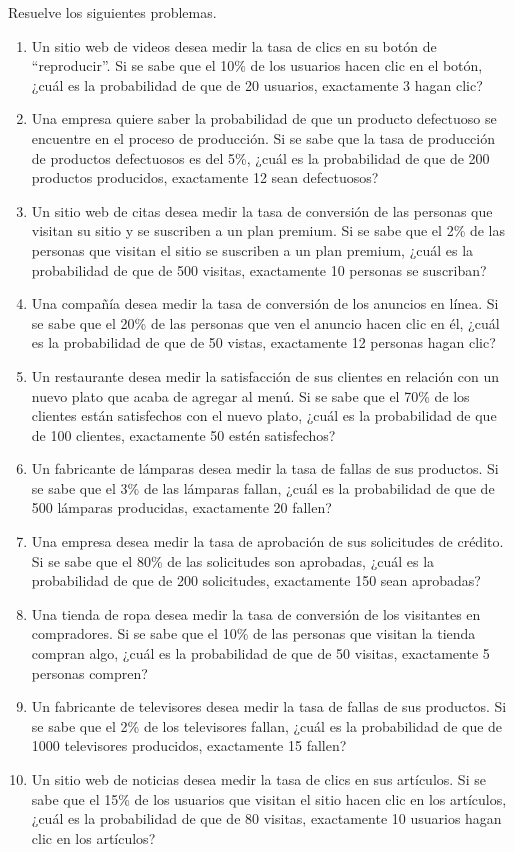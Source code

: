 \begin{Ejer} 
Resuelve los siguientes problemas.

\begin{enumerate}
    \item Un sitio web de videos desea medir la tasa de clics en su botón de ``reproducir''. Si se sabe que el 10\% de los usuarios hacen clic en el botón, ¿cuál es la probabilidad de que de 20 usuarios, exactamente 3 hagan clic?
    \item Una empresa quiere saber la probabilidad de que un producto defectuoso se encuentre en el proceso de producción. Si se sabe que la tasa de producción de productos defectuosos es del 5\%, ¿cuál es la probabilidad de que de 200 productos producidos, exactamente 12 sean defectuosos?
    \item Un sitio web de citas desea medir la tasa de conversión de las personas que visitan su sitio y se suscriben a un plan premium. Si se sabe que el 2\% de las personas que visitan el sitio se suscriben a un plan premium, ¿cuál es la probabilidad de que de 500 visitas, exactamente 10 personas se suscriban?
    \item Una compañía desea medir la tasa de conversión de los anuncios en línea. Si se sabe que el 20\% de las personas que ven el anuncio hacen clic en él, ¿cuál es la probabilidad de que de 50 vistas, exactamente 12 personas hagan clic?
    \item Un restaurante desea medir la satisfacción de sus clientes en relación con un nuevo plato que acaba de agregar al menú. Si se sabe que el 70\% de los clientes están satisfechos con el nuevo plato, ¿cuál es la probabilidad de que de 100 clientes, exactamente 50 estén satisfechos?
    \item Un fabricante de lámparas desea medir la tasa de fallas de sus productos. Si se sabe que el 3\% de las lámparas fallan, ¿cuál es la probabilidad de que de 500 lámparas producidas, exactamente 20 fallen?
    \item Una empresa desea medir la tasa de aprobación de sus solicitudes de crédito. Si se sabe que el 80\% de las solicitudes son aprobadas, ¿cuál es la probabilidad de que de 200 solicitudes, exactamente 150 sean aprobadas?
    \item Una tienda de ropa desea medir la tasa de conversión de los visitantes en compradores. Si se sabe que el 10\% de las personas que visitan la tienda compran algo, ¿cuál es la probabilidad de que de 50 visitas, exactamente 5 personas compren?
    \item Un fabricante de televisores desea medir la tasa de fallas de sus productos. Si se sabe que el 2\% de los televisores fallan, ¿cuál es la probabilidad de que de 1000 televisores producidos, exactamente 15 fallen?
    \item Un sitio web de noticias desea medir la tasa de clics en sus artículos. Si se sabe que el 15\% de los usuarios que visitan el sitio hacen clic en los artículos, ¿cuál es la probabilidad de que de 80 visitas, exactamente 10 usuarios hagan clic en los artículos?

\end{enumerate}
\end{Ejer}

